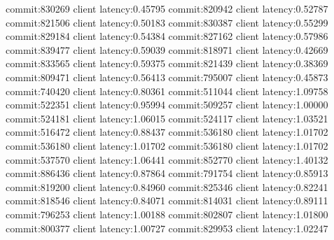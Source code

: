 commit:830269 client latency:0.45795
commit:820942 client latency:0.52787
commit:821506 client latency:0.50183
commit:830387 client latency:0.55299
commit:829184 client latency:0.54384
commit:827162 client latency:0.57986
commit:839477 client latency:0.59039
commit:818971 client latency:0.42669
commit:833565 client latency:0.59375
commit:821439 client latency:0.38369
commit:809471 client latency:0.56413
commit:795007 client latency:0.45873
commit:740420 client latency:0.80361
commit:511044 client latency:1.09758
commit:522351 client latency:0.95994
commit:509257 client latency:1.00000
commit:524181 client latency:1.06015
commit:524117 client latency:1.03521
commit:516472 client latency:0.88437
commit:536180 client latency:1.01702
commit:536180 client latency:1.01702
commit:536180 client latency:1.01702
commit:537570 client latency:1.06441
commit:852770 client latency:1.40132
commit:886436 client latency:0.87864
commit:791754 client latency:0.85913
commit:819200 client latency:0.84960
commit:825346 client latency:0.82241
commit:818546 client latency:0.84071
commit:814031 client latency:0.89111
commit:796253 client latency:1.00188
commit:802807 client latency:1.01800
commit:800377 client latency:1.00727
commit:829953 client latency:1.02247